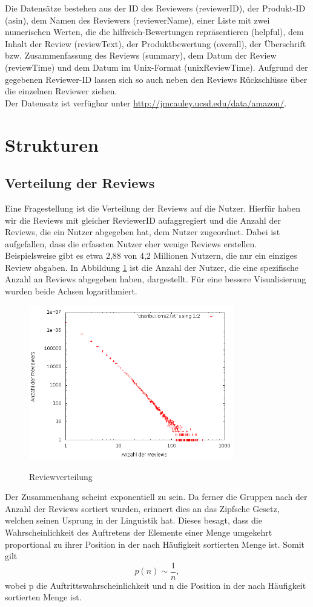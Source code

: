 \documentclass{scrartcl}
\theoremstyle{my_th_style}
\begin{document}
Die Datensätze bestehen aus der ID des Reviewers (reviewerID), der Produkt-ID (asin), dem Namen des Reviewers (reviewerName), einer Liste mit zwei numerischen Werten, die die hilfreich-Bewertungen repräsentieren (helpful), dem Inhalt der Review (reviewText), der Produktbewertung (overall), der Überschrift bzw. Zusammenfassung des Reviews (summary), dem Datum der Review (reviewTime) und dem Datum im Unix-Format (unixReviewTime). Aufgrund der gegebenen Reviewer-ID lassen sich so auch neben den Reviews Rückschlüsse über die einzelnen Reviewer ziehen.\\
Der Datensatz ist verfügbar unter \url{http://jmcauley.ucsd.edu/data/amazon/}.
\section{Strukturen}
\subsection{Verteilung der Reviews}
Eine Fragestellung ist die Verteilung der Reviews auf die Nutzer. Hierfür haben wir die Reviews mit gleicher ReviewerID aufaggregiert und die Anzahl der Reviews, die ein Nutzer abgegeben hat, dem Nutzer zugeordnet. Dabei ist aufgefallen, dass die erfassten Nutzer eher wenige Reviews erstellen. Beispielsweise gibt es etwa 2,88 von 4,2 Millionen Nutzern, die nur ein einziges Review abgaben. In Abbildung \ref{fig_reviews} ist die Anzahl der Nutzer, die eine spezifische Anzahl an Reviews abgegeben haben, dargestellt. Für eine bessere Visualisierung wurden beide Achsen logarithmiert. 
\begin{figure}
    \centering
    \includegraphics[width=0.8\textwidth]{bild.png}
    \label{fig_reviews}
    \caption{Reviewverteilung}
\end{figure}
Der Zusammenhang scheint exponentiell zu sein. Da ferner die Gruppen nach der Anzahl der Reviews sortiert wurden, erinnert dies an das Zipfsche Gesetz, welchen seinen Usprung in der Linguistik hat. Dieses besagt, dass die Wahrscheinlichkeit des Auftretens der Elemente einer Menge umgekehrt proportional zu ihrer Position in der nach Häufigkeit sortierten Menge ist. Somit gilt 
\begin{equation}
	p(n)\sim \frac{1}{n},
\end{equation}
wobei p die Auftrittswahrscheinlichkeit und n die Position in der nach Häufigkeit sortierten Menge ist.
\end{document}
